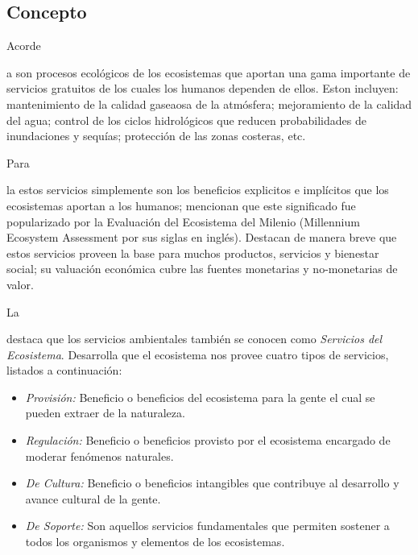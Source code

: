 \documentclass[stu, 12pt, letterpaper, donotrepeattitle, floatsintext, natbib]{apa7}
\begin{document}
\subsection{Concepto}
Acorde \begin{justifying}       
    a \cite{conabio-no-date}
    son procesos ecológicos de los ecosistemas que aportan una gama importante de servicios gratuitos
    de los cuales los humanos dependen de ellos. Eston incluyen: mantenimiento de la calidad gaseaosa de la atmósfera;
    mejoramiento de la calidad del agua; control de los ciclos hidrológicos que reducen probabilidades de inundaciones y sequías;
    protección de las zonas costeras, etc.\par
\end{justifying}
Para \begin{justifying}
    la \cite{unece-no-date}
    estos servicios simplemente son los beneficios explicitos e implícitos que los ecosistemas aportan a los humanos; mencionan que este significado fue popularizado por
    la Evaluación del Ecosistema del Milenio (Millennium Ecosystem Assessment por sus siglas en inglés). Destacan de manera breve que estos servicios
    proveen la base para muchos productos, servicios y bienestar social; su valuación económica cubre las fuentes monetarias y no-monetarias de valor.\par
\end{justifying}
La \begin{justifying}
    \cite{national-wildlife-federation-no-date}
    destaca que los servicios ambientales también se conocen como \emph{Servicios del Ecosistema}. Desarrolla que
    el ecosistema nos provee cuatro tipos de servicios, listados a continuación:
    \begin{itemize}
        \item \emph{Provisión:} Beneficio o beneficios del ecosistema para la gente el cual se pueden extraer de la naturaleza.
        \item \emph{Regulación:} Beneficio o beneficios provisto por el ecosistema encargado de moderar fenómenos naturales.
        \item \emph{De Cultura:} Beneficio o beneficios intangibles que contribuye al desarrollo y avance cultural de la gente.
        \item \emph{De Soporte:} Son aquellos servicios fundamentales que permiten sostener a todos los organismos y elementos de los ecosistemas.
    \end{itemize}\par
\end{justifying}        
\vspace{\baselineskip}
\end{document}
